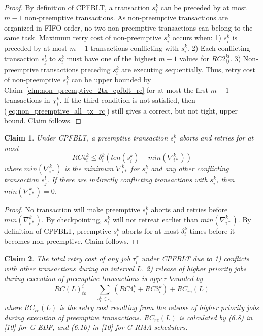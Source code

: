 \documentclass[preprint]{sigplanconf}
\newtheorem{clm}{Claim}
\begin{document}
%
\begin{proof}
By definition of CPFBLT, a transaction $s_i^k$ can be preceded by at most $m-1$ non-preemptive transactions. As non-preemptive transactions are organized in FIFO order, no two non-preemptive transactions can belong to the same task. Maximum retry cost of non-preemptive $s_i^k$ occurs when: 1) $s_i^k$ is preceded by at most $m-1$ transactions conflicting with $s_i^k$. 2) Each conflicting transaction $s_j^l$ to $s_i^k$ must have one of the highest $m-1$ values for $RC2_{ij}^{kl}$. 3) Non-preemptive transactions preceding $s_i^k$ are executing sequentially. Thus, retry cost of non-preemptive $s_i^k$ can be upper bounded by Claim~\ref{clm:non_preemptive_2tx_cpfblt_rc} for at most the first $m-1$ transactions in $\chi_i^k$. If the third condition is not satisfied, then (\ref{eq:non_preemptive_all_tx_rc}) still gives a correct, but not tight, upper bound. Claim follows.
\end{proof}
%
\begin{clm}\label{clm:delta_ik_rc}
%
Under CPFBLT, a preemptive transaction $s_i^k$ aborts and retries for at most
\begin{equation}
RC4_i^k \le \delta_i^k \left(len\left(s_i^k\right)-min\left(\nabla_{i*}^k\right)\right)
\label{eq:delta_ik_rc}
\end{equation}
%
where $min\left(\nabla_{i*}^k\right)$ is the minimum $\nabla_{i*}^k$ for $s_i^k$ and any other conflicting transaction $s_j^l$. If there are indirectly conflicting transactions with $s_i^k$, then $min\left(\nabla_{i*}^k\right)=0$.
%
\end{clm}
%
\begin{proof}
%
No transaction will make preemptive $s_i^k$ aborts and retries before $min\left(\nabla_{i*}^k\right)$. By checkpointing, $s_i^k$ will not retreat earlier than $min\left(\nabla_{i*}^k\right)$. By definition of CPFBLT, preemptive $s_i^k$ aborts for at most $\delta_i^k$ times before it becomes non-preemptive. Claim follows.
\end{proof}
%
\begin{clm}\label{clm:closed_nested_fblt_final}
%
The total retry cost of any job $\tau_i^x$ under CPFBLT due to 1) conflicts with other transactions during an interval $L$. 2) release of higher priority jobs during execution of preemptive transactions is upper bounded by
%
\begin{equation}
RC(L)_{to}^i=\sum_{s_i^k \in s_i} \left(RC4_i^k + RC3_i^k \right) + RC_{re}(L)
\label{eq:cpfblt_final}
\end{equation}
where $RC_{re}(L)$ is the retry cost resulting from the release of higher priority jobs during execution of preemptive transactions. $RC_{re}(L)$ is calculated by (6.8) in [10] for G-EDF, and (6.10) in [10] for G-RMA schedulers.
%
\end{clm}
\end{document}
